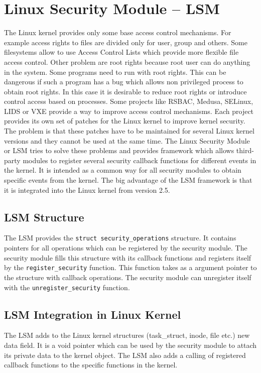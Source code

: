 \chapter{Linux Security Module -- LSM}
\label{lab:lsm}
The Linux kernel provides only some base access control mechanisms. For example access
rights to files are divided only for user, group and others. Some filesystems allow to
use Access Control Lists which provide more flexible file access control. Other
problem are root rights because root user can do anything in the system.
Some programs need to run with root rights. This can be dangerous if such a program
has a bug which allows non privileged process to obtain root rights. In this case it
is desirable to reduce root rights or introduce control access based on processes.
Some projects like RSBAC, Medusa, SELinux, LIDS or VXE provide a way to improve
access control mechanisms. Each project provides its own set of patches for the Linux
kernel to improve kernel security. The problem is that these patches have to be maintained for
several Linux kernel versions and they cannot be used at the same time. The Linux
Security Module or LSM tries to solve these problems and provides framework which
allows third-party modules to register several security callback functions for
different events in the kernel. It is intended as a common way for all security modules
to obtain specific events from the kernel. The big advantage of the LSM framework is that it
is integrated into the Linux kernel from version 2.5.

\section{LSM Structure}
The LSM provides the \texttt{struct security\_operations} structure. It contains pointers
for all operations which can be registered by the security module. The security module fills
this structure with its callback functions and registers itself by the
\texttt{register\_security} function. This function takes as a argument pointer to the
structure with callback operations. The security module can unregister itself
with the \texttt{unregister\_security} function. 

\section{LSM Integration in Linux Kernel}
The LSM adds to the Linux kernel structures (task\_struct, inode, file etc.) new data
field. It is a void pointer which can be used by the security module to attach its private
data to the kernel object. The LSM also adds a calling of registered callback functions to
the specific functions in the kernel.

